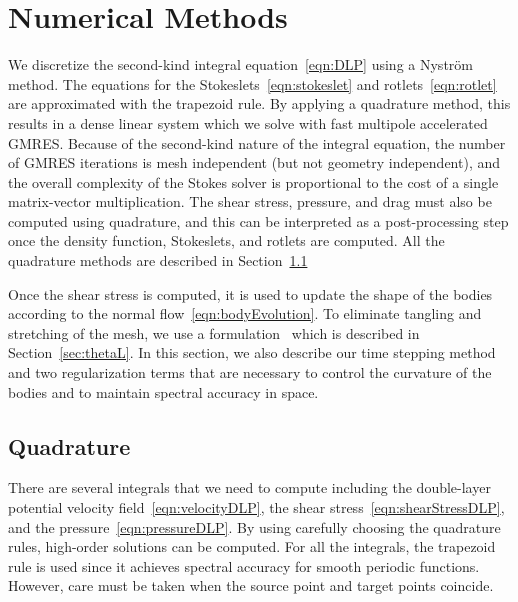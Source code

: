 \documentclass[preprint, 10pt]{elsarticle}
\begin{document}
\section{Numerical Methods\label{s:method}} 
We discretize the second-kind integral equation~\eqref{eqn:DLP} using a
Nystr\"om method.  The equations for the
Stokeslets~\eqref{eqn:stokeslet} and rotlets~\eqref{eqn:rotlet} are
approximated with the trapezoid rule.  By applying a quadrature method,
this results in a dense linear system which we solve with fast multipole
accelerated GMRES.  Because of the second-kind nature of the integral
equation, the number of GMRES iterations is mesh independent (but not
geometry independent), and the overall complexity of the Stokes solver
is proportional to the cost of a single matrix-vector multiplication.
The shear stress, pressure, and drag must also be computed using
quadrature, and this can be interpreted as a post-processing step once
the density function, Stokeslets, and rotlets are computed.  All the
quadrature methods are described in Section~\ref{sec:quadrature}

Once the shear stress is computed, it is used to update the shape of the
bodies according to the normal flow~\eqref{eqn:bodyEvolution}.  To
eliminate tangling and stretching of the mesh, we use a \thL
formulation~\cite{hou-low-she1994} which is described in
Section~\ref{sec:thetaL}.  In this section, we also describe our time
stepping method and two regularization terms that are necessary to
control the curvature of the bodies and to maintain spectral accuracy in
space.


\subsection{Quadrature} 
\label{sec:quadrature}
There are several integrals that we need to compute including the
double-layer potential velocity field~\eqref{eqn:velocityDLP}, the shear
stress~\eqref{eqn:shearStressDLP}, and the
pressure~\eqref{eqn:pressureDLP}.  By using carefully choosing the
quadrature rules, high-order solutions can be computed.  For all the
integrals, the trapezoid rule is used since it achieves spectral
accuracy for smooth periodic functions.  However, care must be taken
when the source point and target points coincide.
\end{document}
